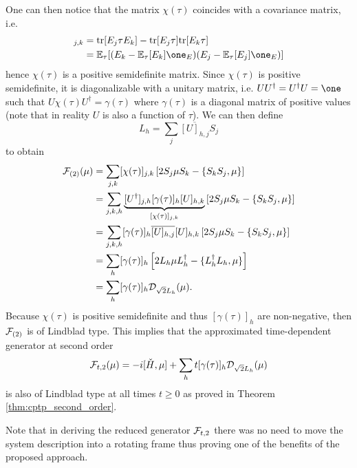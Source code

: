 \documentclass[10pt,aps,pra,twocolumn,showpacs,superscriptaddress,nobalancelastpage,notitlepage,nofootinbib,longbibliography]{revtex4-2}
\begin{document}
One can then notice that the matrix $\chi(\tau)$ coincides with a covariance matrix, i.e. 
\begin{align*}
    [\chi(\tau)]_{j,k} &= \tr[E_j \tau E_k] - \tr[E_j\tau]\tr[E_k\tau]\\
    &= \Eb_\tau[(E_k - \Eb_\tau[E_k]\one_E) (E_j - \Eb_\tau[E_j]\one_E)]
\end{align*}
hence $\chi(\tau)$ is a positive semidefinite matrix.
Since $\chi(\tau)$ is positive semidefinite, it is diagonalizable with a unitary matrix, i.e. $UU^\dag =U^\dag U = \one$ such that $U\chi(\tau) U^\dag = \gamma(\tau)$ where $\gamma(\tau)$ is a diagonal matrix of positive values (note that in reality $U$ is also a function of $\tau$). We can then define 
\[L_h = \sum_j \overline{[U]_{h,j}} S_j \]
to obtain 
\begin{align*}
\mathcal{F}_{(2)}(\mu) 
&=\sum_{j,k} [\chi(\tau)]_{j,k} \left[2S_j \mu S_k - \{ S_kS_j, \mu\}  \right]\\
&=\sum_{j,k,h} \underbrace{[U^\dag]_{j,h}[\gamma(\tau)]_{h} [U]_{h,k}}_{[\chi(\tau)]_{j,k}} \left[2 S_j \mu S_k - \{ S_k S_j, \mu\}  \right]\\
&=\sum_{j,k,h} [\gamma(\tau)]_{h} \overline{[U]_{h,j}}[U]_{h,k} \left[2 S_j \mu S_k - \{ S_k S_j, \mu\}  \right]\\
&=\sum_h [\gamma(\tau)]_{h} \left[2L_h \mu L_h^\dag - \{ L_h^\dag L_h, \mu\}  \right] \\
& = \sum_h [\gamma(\tau)]_h \mathcal{D}_{\sqrt{2} L_h}(\mu).
\end{align*}
Because $\chi(\tau)$ is positive semidefinite and thus $[\gamma(\tau)]_h$ are non-negative, then $\mathcal{F}_{(2)}$ is of Lindblad type. This implies that the approximated time-dependent generator at second order 
\[\mathcal{F}_{t,2}(\mu) = -i[\check{H},\mu] + \sum_h t [\gamma(\tau)]_h \mathcal{D}_{\sqrt{2} L_h}(\mu)\]
is also of Lindblad type at all times $t\geq0$ as proved in Theorem \ref{thm:cptp_second_order}.

Note that in deriving the reduced generator $\mathcal{F}_{t,2}$ there was no need to move the system description into a rotating frame thus proving one of the benefits of the proposed approach. 
\end{document}
